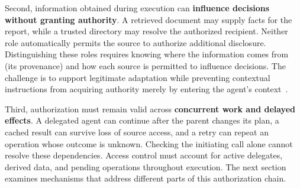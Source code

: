 Second, information obtained during execution can \textbf{influence decisions without granting authority}. A retrieved document may supply facts for the report, while a trusted directory may resolve the authorized recipient. Neither role automatically permits the source to authorize additional disclosure. Distinguishing these roles requires knowing where the information comes from (its provenance) and how each source is permitted to influence decisions. The challenge is to support legitimate adaptation while preventing contextual instructions from acquiring authority merely by entering the agent's context~\cite{conseca,camel,fides}.

Third, authorization must remain valid across \textbf{concurrent work and delayed effects}. A delegated agent can continue after the parent changes its plan, a cached result can survive loss of source access, and a retry can repeat an operation whose outcome is unknown. Checking the initiating call alone cannot resolve these dependencies. Access control must account for active delegates, derived data, and pending operations throughout execution. The next section examines mechanisms that address different parts of this authorization chain.
